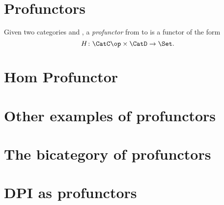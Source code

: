 


\section{Profunctors}

\begin{ctdefinition}[Profunctor]
\label{def:profunctor}
Given two categories \CatC and \CatD, a \emph{profunctor} from \CatC to \CatD is a functor of the form
\begin{equation}
    H\colon \CatC\op \times \CatD \to \Set.
\end{equation}
\end{ctdefinition}


\section{Hom Profunctor}




\section{Other examples of profunctors}




\section{The bicategory of profunctors}


\section{DPI as profunctors}
